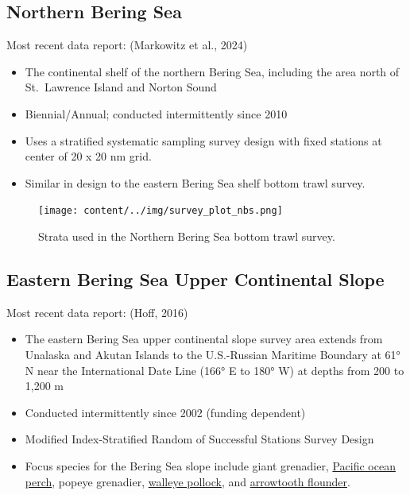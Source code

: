 \documentclass[
  letterpaper,
  oneside,
  open=any]{scrbook}
\providecommand{\tightlist}{%
  \setlength{\itemsep}{0pt}\setlength{\parskip}{0pt}}\usepackage{longtable,booktabs,array}
\begin{document}
\subsection{\texorpdfstring{\textbf{Northern Bering
Sea}}{Northern Bering Sea}}\label{northern-bering-sea}

Most recent data report: (Markowitz et al., 2024)

\begin{itemize}
\tightlist
\item
  The continental shelf of the northern Bering Sea, including the area
  north of St.~Lawrence Island and Norton Sound
\item
  Biennial/Annual; conducted intermittently since 2010
\item
  Uses a stratified systematic sampling survey design with fixed
  stations at center of 20 x 20 nm grid.
\item
  Similar in design to the eastern Bering Sea shelf bottom trawl survey.
\end{itemize}

\begin{figure}[H]

{\centering \texttt{[image: content/../img/survey\_plot\_nbs.png]}

}

\caption{Strata used in the Northern Bering Sea bottom trawl survey.}

\end{figure}%

\subsection{\texorpdfstring{\textbf{Eastern Bering Sea Upper Continental
Slope}}{Eastern Bering Sea Upper Continental Slope}}\label{eastern-bering-sea-upper-continental-slope}

Most recent data report: (Hoff, 2016)

\begin{itemize}
\tightlist
\item
  The eastern Bering Sea upper continental slope survey area extends
  from Unalaska and Akutan Islands to the U.S.-Russian Maritime Boundary
  at 61° N near the International Date Line (166° E to 180° W) at depths
  from 200 to 1,200 m
\item
  Conducted intermittently since 2002 (funding dependent)
\item
  Modified Index-Stratified Random of Successful Stations Survey Design
\item
  Focus species for the Bering Sea slope include giant grenadier,
  \href{https://www.fisheries.noaa.gov/species/pacific-ocean-perch}{Pacific
  ocean perch}, popeye grenadier,
  \href{https://www.fisheries.noaa.gov/species/alaska-pollock}{walleye
  pollock}, and
  \href{https://www.fisheries.noaa.gov/species/arrowtooth-flounder}{arrowtooth
  flounder}.
\end{itemize}
\end{document}
